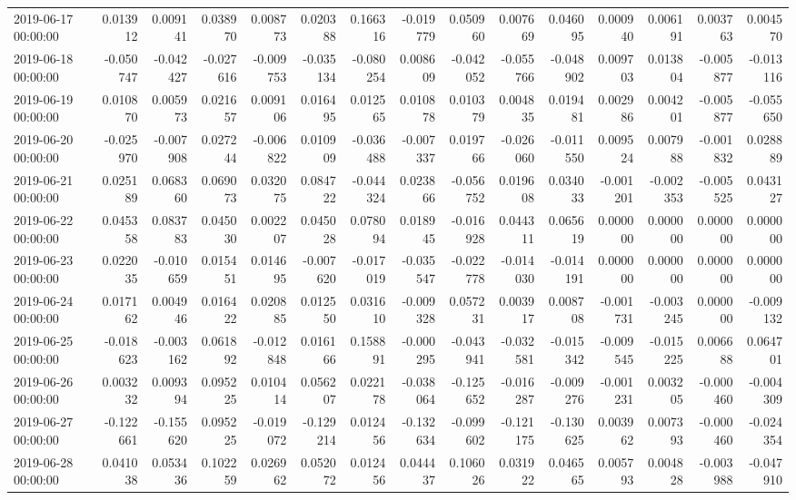 \begin{tabular}{lrrrrrrrrrrrrrr}
2019-06-17 00:00:00 & 0.013912 & 0.009141 & 0.038970 & 0.008773 & 0.020388 & 0.166316 & -0.019779 & 0.050960 & 0.007669 & 0.046095 & 0.000940 & 0.006191 & 0.003763 & 0.004570 \\
2019-06-18 00:00:00 & -0.050747 & -0.042427 & -0.027616 & -0.009753 & -0.035134 & -0.080254 & 0.008609 & -0.042052 & -0.055766 & -0.048902 & 0.009703 & 0.013804 & -0.005877 & -0.013116 \\
2019-06-19 00:00:00 & 0.010870 & 0.005973 & 0.021657 & 0.009106 & 0.016495 & 0.012565 & 0.010878 & 0.010379 & 0.004835 & 0.019481 & 0.002986 & 0.004201 & -0.005877 & -0.055650 \\
2019-06-20 00:00:00 & -0.025970 & -0.007908 & 0.027244 & -0.006822 & 0.010909 & -0.036488 & -0.007337 & 0.019766 & -0.026060 & -0.011550 & 0.009524 & 0.007988 & -0.001832 & 0.028889 \\
2019-06-21 00:00:00 & 0.025189 & 0.068360 & 0.069073 & 0.032075 & 0.084722 & -0.044324 & 0.023866 & -0.056752 & 0.019608 & 0.034033 & -0.001201 & -0.002353 & -0.005525 & 0.043127 \\
2019-06-22 00:00:00 & 0.045358 & 0.083783 & 0.045030 & 0.002207 & 0.045028 & 0.078094 & 0.018945 & -0.016928 & 0.044311 & 0.065619 & 0.000000 & 0.000000 & 0.000000 & 0.000000 \\
2019-06-23 00:00:00 & 0.022035 & -0.010659 & 0.015451 & 0.014695 & -0.007620 & -0.017019 & -0.035547 & -0.022778 & -0.014030 & -0.014191 & 0.000000 & 0.000000 & 0.000000 & 0.000000 \\
2019-06-24 00:00:00 & 0.017162 & 0.004946 & 0.016422 & 0.020885 & 0.012550 & 0.031610 & -0.009328 & 0.057231 & 0.003917 & 0.008708 & -0.001731 & -0.003245 & 0.000000 & -0.009132 \\
2019-06-25 00:00:00 & -0.018623 & -0.003162 & 0.061892 & -0.012848 & 0.016166 & 0.158891 & -0.000295 & -0.043941 & -0.032581 & -0.015342 & -0.009545 & -0.015225 & 0.006688 & 0.064701 \\
2019-06-26 00:00:00 & 0.003232 & 0.009394 & 0.095225 & 0.010414 & 0.056207 & 0.022178 & -0.038064 & -0.125652 & -0.016287 & -0.009276 & -0.001231 & 0.003205 & -0.000460 & -0.004309 \\
2019-06-27 00:00:00 & -0.122661 & -0.155620 & 0.095225 & -0.019072 & -0.129214 & 0.012456 & -0.132634 & -0.099602 & -0.121175 & -0.130625 & 0.003962 & 0.007393 & -0.000460 & -0.024354 \\
2019-06-28 00:00:00 & 0.041038 & 0.053436 & 0.102259 & 0.026962 & 0.052072 & 0.012456 & 0.044437 & 0.106026 & 0.031922 & 0.046565 & 0.005793 & 0.004828 & -0.003988 & -0.047910 \\

\end{tabular}

